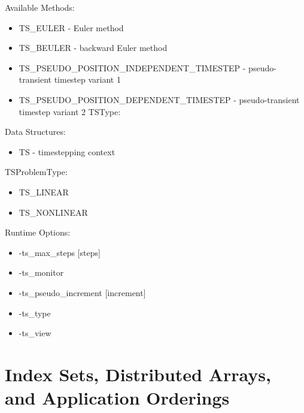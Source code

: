 \noindent
Available Methods: 
\begin{itemize}
\item TS\_EULER - Euler method
\item TS\_BEULER - backward Euler method
\item TS\_PSEUDO\_POSITION\_INDEPENDENT\_TIMESTEP - pseudo-transient timestep variant 1
\item TS\_PSEUDO\_POSITION\_DEPENDENT\_TIMESTEP - pseudo-transient timestep variant 2
TSType: 
\end{itemize}
Data Structures:
\begin{itemize}
\item TS - timestepping context
\end{itemize}
TSProblemType:
\begin{itemize}
\item TS\_LINEAR
\item TS\_NONLINEAR
\end{itemize}
Runtime Options:
\begin{itemize}
\item -ts\_max\_steps [steps]
\item -ts\_monitor
\item -ts\_pseudo\_increment [increment]
\item -ts\_type
\item -ts\_view
\end{itemize}


{\small
\noindent

}

\section{Index Sets, Distributed Arrays, and Application Orderings}

